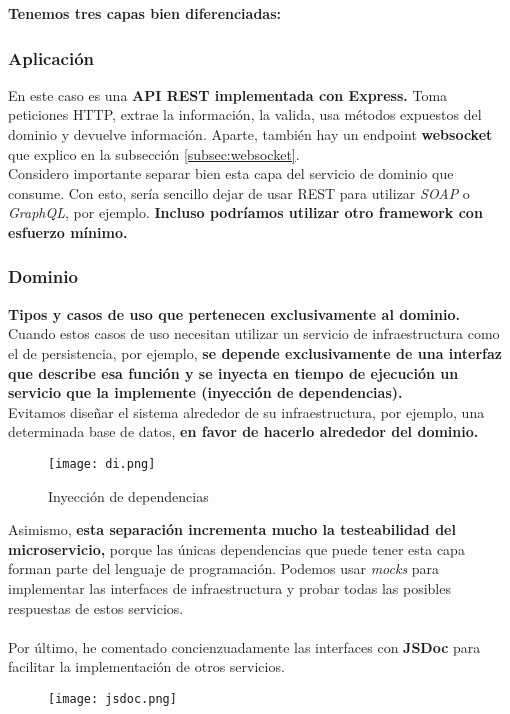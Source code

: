 \textbf{Tenemos tres capas bien diferenciadas:}


\subsubsection{Aplicación}
En este caso es una \textbf{API REST implementada con Express.} Toma peticiones HTTP, extrae la información, la valida, usa métodos expuestos del dominio y devuelve información.
Aparte, también hay un endpoint \textbf{websocket} que explico en la subsección \ref{subsec:websocket}. \\
Considero importante separar bien esta capa del servicio de dominio que consume. Con esto, sería sencillo dejar de usar 
REST para utilizar \textit{SOAP} o \textit{GraphQL}, por ejemplo. \textbf{Incluso podríamos utilizar otro framework con esfuerzo mínimo.}

\subsubsection{Dominio}
\textbf{Tipos y casos de uso que pertenecen exclusivamente al dominio.}
Cuando estos casos de uso necesitan utilizar un servicio de infraestructura como el de persistencia, por ejemplo,
\textbf{se depende exclusivamente de una interfaz que describe esa función y se inyecta en tiempo de ejecución un servicio que la implemente (inyección de dependencias).}
\\Evitamos diseñar el sistema alrededor de su infraestructura, por ejemplo, una determinada base de datos, \textbf{en favor de hacerlo alrededor del dominio.}
\begin{figure}[H]
	\centering	
	\texttt{[image: di.png]}
	\caption{Inyección de dependencias}
	\end{figure}

Asimismo, \textbf{esta separación incrementa mucho la testeabilidad del microservicio,} porque las únicas dependencias
que puede tener esta capa forman parte del lenguaje de programación. Podemos usar \textit{mocks} para implementar
las interfaces de infraestructura y probar todas las posibles respuestas de estos servicios. \\ \\
Por último, he comentado concienzuadamente las interfaces con \textbf{JSDoc} \cite{jsdoc} para facilitar la implementación de otros servicios.
\begin{figure}[H]
	\centering	
	\texttt{[image: jsdoc.png]}
	\end{figure}

